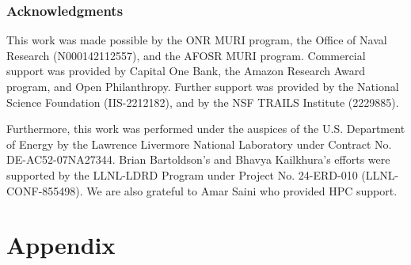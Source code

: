 \documentclass{article} %
\begin{document}
\subsubsection*{Acknowledgments}
This work was made possible by the ONR MURI program, the Office of Naval Research (N000142112557), and the AFOSR MURI program. Commercial support was provided by Capital One Bank, the Amazon Research Award program, and Open Philanthropy. Further support was provided by the National Science Foundation (IIS-2212182), and by the NSF TRAILS Institute (2229885).

Furthermore, this work was performed under the auspices of the U.S. Department of Energy by the Lawrence Livermore National Laboratory under Contract No. DE-AC52-07NA27344. Brian Bartoldson's and Bhavya Kailkhura's efforts were supported by the LLNL-LDRD Program under Project No. 24-ERD-010 (LLNL-CONF-855498). We are also grateful to Amar Saini who provided HPC support.




\newpage
\appendix
\section{Appendix}
\end{document}
